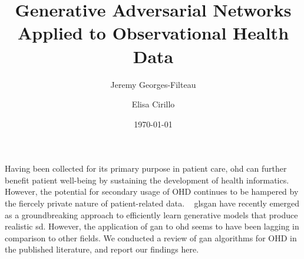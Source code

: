 \documentclass[9pt,acronym]{article}
\renewenvironment{abstract}
 {{\bfseries\noindent{\abstractname}\par\nobreak}\footnotesize}
 {\bigskip}
\begin{document}
    

    \title{Generative Adversarial Networks Applied to Observational Health Data}
    
    \author[1,2]{Jeremy Georges-Filteau}%
    \author[2]{Elisa Cirillo}%


    \vspace{-1em}

    \date{\today}

    \begingroup
    \let\center\flushleft
    \let\endcenter\endflushleft
    \maketitle
    \endgroup



    \begin{abstract}
    Having been collected for its primary purpose in patient care, \gls{ohd} can further benefit patient well-being
    by sustaining the development of health informatics.~ However, the potential for secondary usage of OHD continues to be hampered by the fiercely private nature of patient-related data. ~ gls{gan} have recently emerged as a groundbreaking approach to
    efficiently learn generative models that produce realistic \gls{sd}. However, the application of \gls{gan} to \gls{ohd} seems to have been lagging in comparison to other fields. We conducted a review of \gls{gan} algorithms for OHD in the published literature, and report our findings here.
    \end{abstract}

    
    
    
    
    
    

    \pagebreak

    \printglossary[type=oalgo]
    \printglossary[type=\acronymtype]
    \printglossary

    \pagebreak

    
\end{document}

